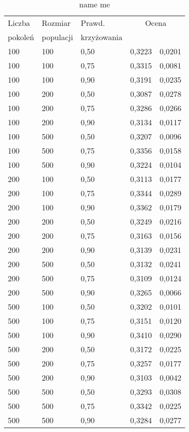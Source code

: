 \documentclass[11pt,a4paper,oneside]{report}
\begin{document}
\begin{center}
	\begin{longtable}{|l|l|l|r@{$\pm$}r|}
		\caption{name me}\\
		\hline
		Liczba & Rozmiar & Prawd. & \multicolumn{2}{|c|}{Ocena}\\
		pokoleń & populacji & krzyżowania & \multicolumn{2}{|c|}{}\\ \hline \hline\endhead
		100 & 100 & 0,50 & 0,3223 & 0,0201\\ \hline
		100 & 100 & 0,75 & 0,3315 & 0,0081\\ \hline
		100 & 100 & 0,90 & 0,3191 & 0,0235\\ \hline
		100 & 200 & 0,50 & 0,3087 & 0,0278\\ \hline
		100 & 200 & 0,75 & 0,3286 & 0,0266\\ \hline
		100 & 200 & 0,90 & 0,3134 & 0,0117\\ \hline
		100 & 500 & 0,50 & 0,3207 & 0,0096\\ \hline
		100 & 500 & 0,75 & 0,3356 & 0,0158\\ \hline
		100 & 500 & 0,90 & 0,3224 & 0,0104\\ \hline
		200 & 100 & 0,50 & 0,3113 & 0,0177\\ \hline
		200 & 100 & 0,75 & 0,3344 & 0,0289\\ \hline
		200 & 100 & 0,90 & 0,3362 & 0,0179\\ \hline
		200 & 200 & 0,50 & 0,3249 & 0,0216\\ \hline
		200 & 200 & 0,75 & 0,3163 & 0,0156\\ \hline
		200 & 200 & 0,90 & 0,3139 & 0,0231\\ \hline
		200 & 500 & 0,50 & 0,3132 & 0,0241\\ \hline
		200 & 500 & 0,75 & 0,3109 & 0,0124\\ \hline
		200 & 500 & 0,90 & 0,3265 & 0,0066\\ \hline
		500 & 100 & 0,50 & 0,3202 & 0,0101\\ \hline
		500 & 100 & 0,75 & 0,3151 & 0,0120\\ \hline
		500 & 100 & 0,90 & 0,3410 & 0,0290\\ \hline
		500 & 200 & 0,50 & 0,3172 & 0,0225\\ \hline
		500 & 200 & 0,75 & 0,3257 & 0,0177\\ \hline
		500 & 200 & 0,90 & 0,3103 & 0,0042\\ \hline
		500 & 500 & 0,50 & 0,3293 & 0,0308\\ \hline
		500 & 500 & 0,75 & 0,3342 & 0,0225\\ \hline
		500 & 500 & 0,90 & 0,3284 & 0,0277\\ \hline
	\end{longtable}
\end{center}
\end{document}
